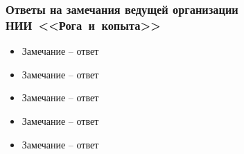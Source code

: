 \begin{frame}
    \frametitle{Ответы на замечания ведущей организации НИИ~<<Рога~и~копыта>>}
    \begin{itemize}
        \item Замечание -- ответ
        \item Замечание -- ответ
        \item Замечание -- ответ
        \item Замечание -- ответ
        \item Замечание -- ответ
    \end{itemize}
\end{frame}